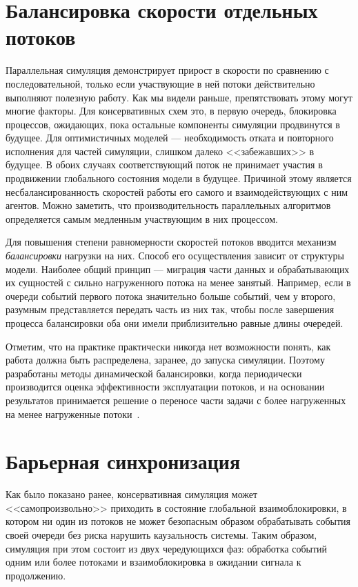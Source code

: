 \section{Балансировка скорости отдельных потоков}

Параллельная симуляция демонстрирует прирост в скорости по сравнению с последовательной, только если участвующие в ней потоки действительно выполняют полезную работу. Как мы видели раньше, препятствовать этому могут многие факторы. Для консервативных схем это, в первую очередь, блокировка процессов, ожидающих, пока остальные компоненты симуляции продвинутся в будущее. Для оптимистичных моделей --- необходимость отката и повторного исполнения для частей симуляции, слишком далеко <<забежавших>> в будущее. В обоих случаях соответствующий поток не принимает участия в продвижении глобального состояния модели в будущее. Причиной этому является несбалансированность скоростей работы его самого и взаимодействующих с ним агентов. Можно заметить, что производительность параллельных алгоритмов определяется самым медленным участвующим в них процессом.

Для повышения степени равномерности скоростей потоков вводится механизм \textit{балансировки} нагрузки на них. Способ его осуществления зависит от структуры модели. Наиболее общий принцип --- миграция части данных и обрабатывающих их сущностей с сильно нагруженного потока на менее занятый. Например, если в очереди событий первого потока значительно больше событий, чем у второго, разумным представляется передать часть из них так, чтобы после завершения процесса балансировки оба они имели приблизительно равные длины очередей.

Отметим, что на практике практически никогда нет возможности понять, как работа должна быть распределена, заранее, до запуска симуляции. Поэтому разработаны методы динамической балансировки, когда периодически производится оценка эффективности эксплуатации потоков, и на основании результатов принимается решение о переносе части задачи с более нагруженных на менее нагруженные потоки~\cite{DBLP:conf/pads/PeschlowHM07}.

\section{Барьерная синхронизация}

Как было показано ранее, консервативная симуляция может <<самопроизвольно>> приходить в состояние глобальной взаимоблокировки, в котором ни один из потоков не может безопасным образом обрабатывать события своей очереди без риска нарушить каузальность системы. Таким образом, симуляция при этом состоит из двух чередующихся фаз: обработка событий одним или более потоками и взаимоблокировка в ожидании сигнала к продолжению.


